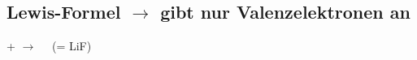 



\subsection{Lewis-Formel $\rightarrow$ gibt nur Valenzelektronen an}
\begin{center}
     +
    $\longrightarrow$
    $\quad$(= LiF)
\end{center}
